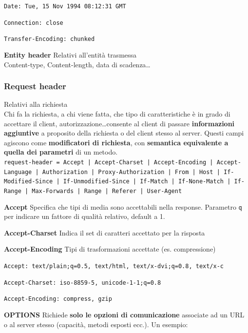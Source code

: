 \documentclass[10pt]{article}
\begin{document}
\begin{list}{}{}
\begin{list}{}{}
\begin{list}{}{}
\item \texttt{Date: Tue, 15 Nov 1994 08:12:31 GMT}
\item \texttt{Connection: close}
\item \texttt{Transfer-Encoding: chunked}
\end{list}
\item \textbf{Entity header} Relativi all'entità trasmessa\\Content-type, Content-length, data di scadenza\ldots
\item \subsubsection{Request header} Relativi alla richiesta\\Chi fa la richiesta, a chi viene fatta, che tipo di caratteristiche è in grado di accettare il client, autorizzazione\ldots consente al client di passare \textbf{informazioni aggiuntive} a proposito della richiesta o del client stesso al server. Questi campi agiscono come \textbf{modificatori di richiesta}, con \textbf{semantica equivalente a quella dei parametri} di un metodo.\\
\texttt{request-header = Accept | Accept-Charset | Accept-Encoding | Accept-Language | Authorization | Proxy-Authorization | From | Host | If-Modified-Since | If-Unmodified-Since | If-Match | If-None-Match | If-Range | Max-Forwards | Range | Referer | User-Agent}\\
\begin{list}{}{}
\item \textbf{Accept} Specifica che tipi di media sono accettabili nella response. Parametro \texttt{q} per indicare un fattore di qualità relativo, default a 1.
\item \textbf{Accept-Charset} Indica il set di caratteri accettato per la risposta
\item \textbf{Accept-Encoding} Tipi di trasformazioni accettate (es. compressione)
\item
\item \texttt{Accept: text/plain;q=0.5, text/html, text/x-dvi;q=0.8, text/x-c}
\item \texttt{Accept-Charset: iso-8859-5, unicode-1-1;q=0.8}
\item \texttt{Accept-Encoding: compress, gzip}
\end{list}
\begin{list}{}{(Alcuni) metodi request:}
\item \textbf{OPTIONS} Richiede \textbf{solo le opzioni di comunicazione} associate ad un URL o al server stesso (capacità, metodi esposti ecc.). Un esempio:\\

\end{list}
\end{list}
\end{list}
\end{document}

